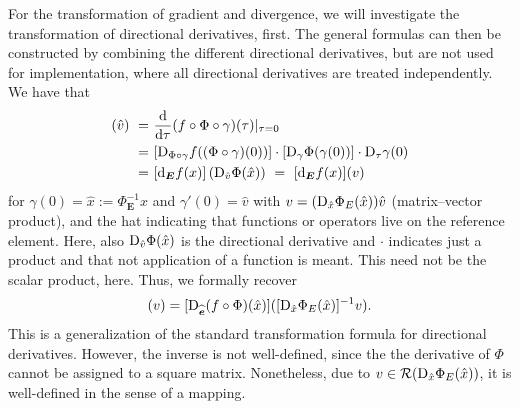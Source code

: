 \documentclass[a4paper, english, 12pt, reqno, draft]{amsart}
\theoremstyle{definition}
\theoremstyle{remark}
\numberwithin{equation}{section}
\newcommand{\edge}{\ensuremath{E}}
\newcommand{\Edge}{{\ensuremath{\boldsymbol E}}}
\newcommand{\RefEdge}{{\ensuremath{\widehat{\boldsymbol e}}}}
\newcommand{\Der}{\ensuremath{\textup d_\Edge}}
\newcommand{\diffeo}{\ensuremath{\Phi}}
\newcommand{\der}{\ensuremath{\textup D}}
\newcommand{\range}{\ensuremath{\mathcal R}}
\begin{document}
For the transformation of gradient and divergence, we will investigate the transformation of directional derivatives, first. The general formulas can then be constructed by combining the different directional derivatives, but are not used for implementation, where all directional derivatives are treated independently. We have that
% 
\begin{align*}
 [\der_\RefEdge (f \circ \diffeo) (\hat x)](\hat v) ~=~ & \frac{\textup d}{\textup d \tau} (f \circ \diffeo \circ \gamma) (\tau)|_{\tau = 0} \\
 ~=~ & [\der_{\diffeo \circ \gamma} f ((\diffeo\circ\gamma) (0))] \cdot [\der_{\gamma} \diffeo(\gamma (0))] \cdot \der_{\tau} \gamma(0)\\
 ~=~ & [\Der f (x)] \left( \der_{\hat v} \diffeo(\hat x) \right) ~=~[\Der f (x)] (v)
\end{align*}
% 
for $\gamma(0) = \hat x := \diffeo^{-1}_\Edge x$ and $\gamma'(0) = \hat v$ with $v = (\der_{\hat x} \diffeo_\edge(\hat x))\hat v$ (matrix--vector product), and the hat indicating that functions or operators live on the reference element. Here, also $\der_{\hat v} \diffeo(\hat x)$ is the directional derivative and $\cdot$ indicates just a product and that not application of a function is meant. This need not be the scalar product, here. Thus, we formally recover
% 
\begin{equation*}
 [\Der f (x)] (v) = [\der_\RefEdge (f \circ \diffeo) (\hat x)]([\der_{\hat x} \diffeo_\edge(\hat x)]^{-1} v).
\end{equation*}
% 
This is a generalization of the standard transformation formula for directional derivatives. However, the inverse is not well-defined, since the the derivative of $\diffeo$ cannot be assigned to a square matrix. Nonetheless, due to $v \in \range (\der_{\hat x} \diffeo_\edge(\hat x))$, it is well-defined in the sense of a mapping.
\end{document}
